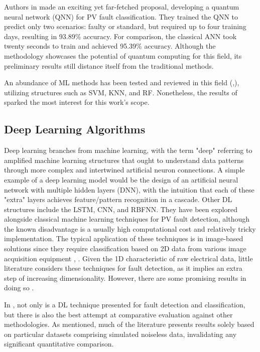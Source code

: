 Authors in \cite{Uehara2021} made an exciting yet far-fetched proposal, developing a quantum neural network (QNN) for PV fault classification. They trained the QNN to predict only two scenarios: faulty or standard, but required up to four training days, resulting in 93.89\% accuracy. For comparison, the classical ANN took twenty seconds to train and achieved 95.39\% accuracy. Although the methodology showcases the potential of quantum computing for this field, its preliminary results still distance itself from the traditional methods.

An abundance of ML methods has been tested and reviewed in this field (\cite{Hong2022},\cite{Livera2019}), utilizing structures such as SVM, KNN, and RF. Nonetheless, the results of \cite{Rao2021}\cite{Kilic2020} sparked the most interest for this work's scope.

\subsection{Deep Learning Algorithms}

Deep learning branches from machine learning, with the term "deep" referring to amplified machine learning structures that ought to understand data patterns through more complex and intertwined artificial neuron connections. A simple example of a deep learning model would be the design of an artificial neural network with multiple hidden layers (DNN), with the intuition that each of these "extra" layers achieves feature/pattern recognition in a cascade. Other DL structures include the LSTM, CNN, and RBFNN. They have been explored alongside classical machine learning techniques for PV fault detection, although the known disadvantage is a usually high computational cost and relatively tricky implementation. The typical application of these techniques is in image-based solutions \cite{termoreview} since they require classification based on 2D data from various image acquisition equipment \cite{termo}, \cite{dlpv}. Given the 1D characteristic of raw electrical data, little literature considers these techniques for fault detection, as it implies an extra step of increasing dimensionality. However, there are some promising results in doing so \cite{Aziz2020}.

In \cite{Aziz2020}, not only is a DL technique presented for fault detection and classification, but there is also the best attempt at comparative evaluation against other methodologies. As mentioned, much of the literature presents results solely based on particular datasets comprising simulated noiseless data, invalidating any significant quantitative comparison.

